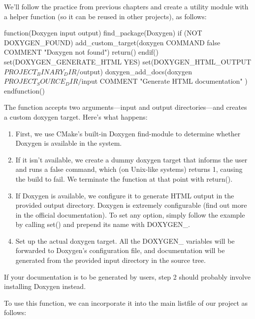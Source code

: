 We’ll follow the practice from previous chapters and create a utility module with a helper function (so it can be reused in other projects), as follows:


\begin{cmake}
function(Doxygen input output)
    find_package(Doxygen)
    if (NOT DOXYGEN_FOUND)
        add_custom_target(doxygen COMMAND false
            COMMENT "Doxygen not found")
        return()
    endif()
    set(DOXYGEN_GENERATE_HTML YES)
    set(DOXYGEN_HTML_OUTPUT
        ${PROJECT_BINARY_DIR}/${output})
    doxygen_add_docs(doxygen
        ${PROJECT_SOURCE_DIR}/${input}
        COMMENT "Generate HTML documentation"
    )
endfunction()
\end{cmake}

The function accepts two arguments—input and output directories—and creates a custom doxygen target. Here’s what happens:

\begin{enumerate}
\item
First, we use CMake’s built-in Doxygen find-module to determine whether Doxygen is available in the system.

\item
If it isn’t available, we create a dummy doxygen target that informs the user and runs a false command, which (on Unix-like systems) returns 1, causing the build to fail. We terminate the function at that point with return().

\item
If Doxygen is available, we configure it to generate HTML output in the provided output directory. Doxygen is extremely configurable (find out more in the official documentation). To set any option, simply follow the example by calling set() and prepend its name with DOXYGEN\_.

\item
Set up the actual doxygen target. All the DOXYGEN\_ variables will be forwarded to Doxygen’s configuration file, and documentation will be generated from the provided input directory in the source tree.
\end{enumerate}

If your documentation is to be generated by users, step 2 should probably involve installing Doxygen instead.

To use this function, we can incorporate it into the main listfile of our project as follows:


